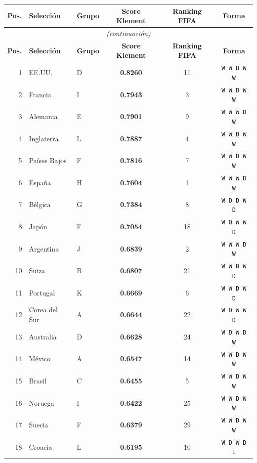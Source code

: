 \documentclass[11pt,a4paper]{article}
\begin{document}
\begin{center}
\begin{longtable}{@{}rllccc@{}}
\toprule
\textbf{Pos.} & \textbf{Selección} & \textbf{Grupo} & \textbf{Score Klement} & \textbf{Ranking FIFA} & \textbf{Forma} \\
\midrule
\endfirsthead
\multicolumn{6}{c}{{\textit{(continuación)}}} \\
\toprule
\textbf{Pos.} & \textbf{Selección} & \textbf{Grupo} & \textbf{Score Klement} & \textbf{Ranking FIFA} & \textbf{Forma} \\
\midrule
\endhead
  1 & EE.UU. & D & \textbf{0.8260} & 11 & \texttt{W W D W W} \\
  \rowcolor{tablerow}2 & Francia & I & \textbf{0.7943} & 3 & \texttt{W W D W W} \\
  3 & Alemania & E & \textbf{0.7901} & 9 & \texttt{W W W D W} \\
  \rowcolor{tablerow}4 & Inglaterra & L & \textbf{0.7887} & 4 & \texttt{W W D W W} \\
  5 & Países Bajos & F & \textbf{0.7816} & 7 & \texttt{W W D W W} \\
  \rowcolor{tablerow}6 & España & H & \textbf{0.7604} & 1 & \texttt{W W W D W} \\
  7 & Bélgica & G & \textbf{0.7384} & 8 & \texttt{W D D W D} \\
  \rowcolor{tablerow}8 & Japón & F & \textbf{0.7054} & 18 & \texttt{W D W W D} \\
  9 & Argentina & J & \textbf{0.6839} & 2 & \texttt{W W W D W} \\
  \rowcolor{tablerow}10 & Suiza & B & \textbf{0.6807} & 21 & \texttt{W W D W D} \\
  11 & Portugal & K & \textbf{0.6669} & 6 & \texttt{W W D W D} \\
  \rowcolor{tablerow}12 & Corea del Sur & A & \textbf{0.6644} & 22 & \texttt{W D W W D} \\
  13 & Australia & D & \textbf{0.6628} & 24 & \texttt{W D W D W} \\
  \rowcolor{tablerow}14 & México & A & \textbf{0.6547} & 14 & \texttt{W W D W W} \\
  15 & Brasil & C & \textbf{0.6455} & 5 & \texttt{W W D W W} \\
  \rowcolor{tablerow}16 & Noruega & I & \textbf{0.6422} & 25 & \texttt{W W D W W} \\
  17 & Suecia & F & \textbf{0.6379} & 29 & \texttt{W W D W W} \\
  \rowcolor{tablerow}18 & Croacia & L & \textbf{0.6195} & 10 & \texttt{W D W D L} \\

\end{longtable}
\end{center}
\end{document}
